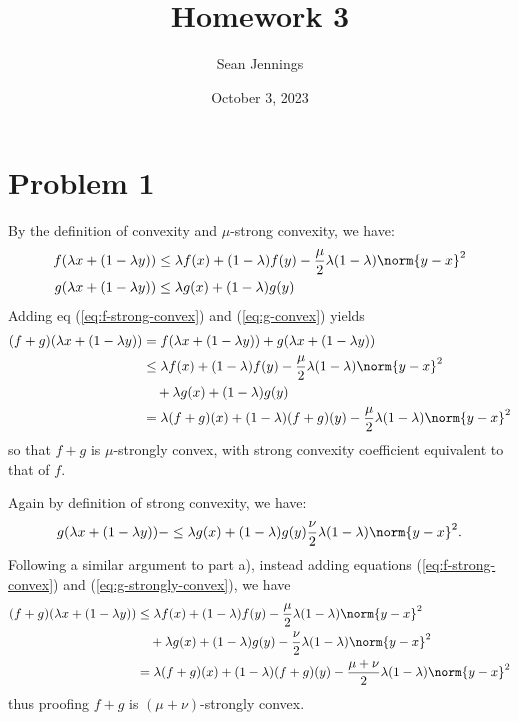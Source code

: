 \documentclass{homework}
\title{Homework 3}
\author{Sean Jennings}
\date{October 3, 2023}
\begin{document}
\maketitle

\section{Problem 1}

\newcommand{\convexarg}{\lambda x + (1 - \lambda y)}
\newcommand{\convexineq}[2]{
    #1(\lambda x + (1 - \lambda y)) #2 \leq \lambda #1 (x)
        + (1 - \lambda) #1 (y)
}
\newcommand{\strongconvexterm}[1]{
    \frac{#1}{2} \lambda (1 - \lambda) \norm{y - x}^2
}

\begin{letterenum}
    \item By the definition of convexity and $\mu$-strong convexity,
        we have:
        \begin{align}
            \convexineq{f}{&} - \strongconvexterm{\mu}
                \label{eq:f-strong-convex}\\
            \convexineq{g}{&} \label{eq:g-convex}
        \end{align}
        Adding eq (\ref{eq:f-strong-convex}) and (\ref{eq:g-convex})
        yields
        \begin{align*}
            (f+g) (\convexarg) &= f(\convexarg) + g(\convexarg) \\
                &\leq \lambda f(x) + (1 - \lambda)f(y) - \strongconvexterm{\mu} \\
                &\quad + \lambda g(x) + (1 - \lambda)g(y) \\
                &= \lambda (f+g)(x) + (1 - \lambda)(f+g)(y) - \strongconvexterm{\mu}
        \end{align*}
        so that $f + g$ is $\mu$-strongly convex, with strong convexity
        coefficient equivalent to that of $f$.

    \item Again by definition of strong convexity, we have:
    \begin{equation}
        \convexineq{g} - \strongconvexterm{\nu}.
        \label{eq:g-strongly-convex}
    \end{equation}
    Following a similar argument to part a), instead adding equations
    (\ref{eq:f-strong-convex}) and (\ref{eq:g-strongly-convex}), we have
    \begin{align*}
        (f + g) (\convexarg)
            &\leq \lambda f(x) + (1 - \lambda)f(y) - \strongconvexterm{\mu} \\
            &\quad + \lambda g(x) + (1 - \lambda)g(y) - \strongconvexterm{\nu} \\
            &= \lambda (f + g)(x) + (1 - \lambda) (f + g)(y) - \strongconvexterm{\mu + \nu}
    \end{align*}
    thus proofing $f + g$ is $(\mu + \nu)$-strongly convex.
\end{letterenum}
\end{document}
